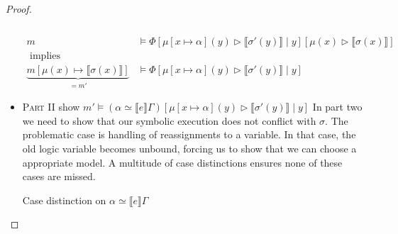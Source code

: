 \documentclass[twoside, english, final]{sdqthesis}
\newcommand{\bbracket}[1]{\llbracket #1 \rrbracket}
\newcommand{\tr}[0]{\triangleright}
\theoremstyle{definition}
\begin{document}
\begin{proof}
\begin{itemize}
\begin{align*}
            [\mu(x) \tr \bbracket{\sigma(x)}]
          \\
        \\ m & \vDash \Phi
          [\mu[x \mapsto \alpha](y) \tr \bbracket{\sigma'(y)} \mid y]
          [\mu(x) \tr \bbracket{\sigma(x)}] 
        \\ \text{ implies } 
        \\\underbrace{m[\mu(x) \mapsto \bbracket{\sigma(x)}]}_{= m'} & \vDash \Phi
            [\mu[x \mapsto \alpha](y) \tr \bbracket{\sigma'(y)} \mid y]
      \end{align*}
    \item \textsc{Part II} show $m' \vDash (\alpha \simeq \bbracket{e}\Gamma)[\mu[x\mapsto \alpha](y) \tr \bbracket{\sigma'(y)} \mid y]$
      In part two we need to show that our symbolic execution does not conflict with $\sigma$. 
      The problematic case is handling of reassignments to a variable. In that case, the old logic variable becomes unbound, forcing us to show that we can choose a appropriate model.
      A multitude of case distinctions ensures none of these cases are missed.

      Case distinction on $\alpha \simeq \bbracket{e}\Gamma$


\end{itemize}
\end{proof}
\end{document}
